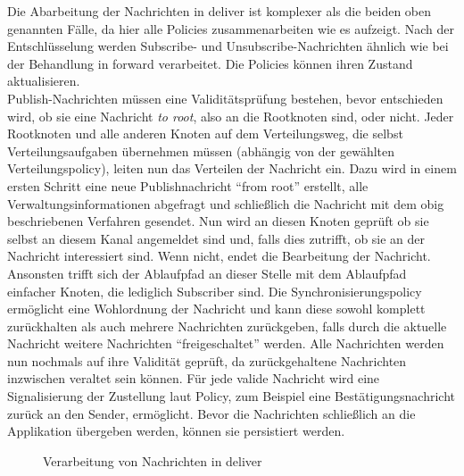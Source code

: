 Die Abarbeitung der Nachrichten in deliver ist komplexer als die beiden oben genannten Fälle, da hier alle Policies zusammenarbeiten wie es  aufzeigt. Nach der Entschlüsselung werden Subscribe- und Unsubscribe-Nachrichten ähnlich wie bei der Behandlung in forward verarbeitet. Die Policies können ihren Zustand aktualisieren.\\
Publish-Nachrichten müssen eine Validitätsprüfung bestehen, bevor entschieden wird, ob sie eine Nachricht \emph{to root}, also an die Rootknoten sind, oder nicht. Jeder Rootknoten und alle anderen Knoten auf dem Verteilungsweg, die selbst Verteilungsaufgaben übernehmen müssen (abhängig von der gewählten Verteilungspolicy), leiten nun das Verteilen der Nachricht ein. Dazu wird in einem ersten Schritt eine neue Publishnachricht ``from root'' erstellt, alle Verwaltungsinformationen abgefragt und schließlich die Nachricht mit dem obig beschriebenen Verfahren gesendet. Nun wird an diesen Knoten geprüft ob sie selbst an diesem Kanal angemeldet sind und, falls dies zutrifft, ob sie an der Nachricht interessiert sind. Wenn nicht, endet die Bearbeitung der Nachricht. Ansonsten trifft sich der Ablaufpfad an dieser Stelle mit dem Ablaufpfad einfacher Knoten, die lediglich Subscriber sind. Die Synchronisierungspolicy ermöglicht eine Wohlordnung der Nachricht und kann diese sowohl komplett zurückhalten als auch mehrere Nachrichten zurückgeben, falls durch die aktuelle Nachricht weitere Nachrichten ``freigeschaltet'' werden. Alle Nachrichten werden nun nochmals auf ihre Validität geprüft, da zurückgehaltene Nachrichten inzwischen veraltet sein können. Für jede valide Nachricht wird eine Signalisierung der Zustellung laut Policy, zum Beispiel eine Bestätigungsnachricht zurück an den Sender, ermöglicht. Bevor die Nachrichten schließlich an die Applikation übergeben werden, können sie persistiert werden.

\begin{figure}[htbp]
\centering
{}
\caption{Verarbeitung von Nachrichten in deliver}
\label{fig:processing_deliver}
\end{figure}

